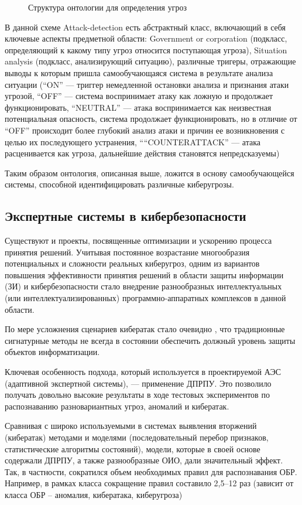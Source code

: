 \begin{figure}[h]
    \caption{Структура онтологии для определения угроз \cite{wars}}
    \label{ont}
\end{figure}

В данной схеме Attack-detection есть абстрактный класс, включающий в себя ключевые аспекты предметной
области: Government or corporation (подкласс, определяющий к какому типу угроз относится поступающая угроза),
Situation analysis (подкласс, анализирующий ситуацию), различные тригеры, отражающие выводы к которым пришла
самообучающаяся система в результате анализа ситуации (``ON'' --- триггер немедленной остановки анализа и
признания атаки угрозой, ``OFF'' --- система воспринимает атаку как ложную и продолжает функционировать,
``NEUTRAL'' --- атака воспринимается как неизвестная потенциальная опасность, система продолжает функционировать,
но в отличие от ``OFF'' происходит более глубокий анализ атаки и причин ее возникновения с целью их
последующего устранения, ``“COUNTERATTACK'' --- атака расценивается как угроза, дальнейшие действия становятся
непредсказуемы)

Таким образом онтология, описанная выше, ложится в основу самообучающейся системы, способной идентифицировать
различные киберугрозы.

\subsection{Экспертные системы в кибербезопасности}
Существуют и проекты, посвященные оптимизации и ускорению процесса принятия решений. Учитывая постоянное
возрастание многообразия потенциальных и сложности реальных киберугроз, одним из вариантов
повышения эффективности принятия решений в области защиты
информации (ЗИ) и кибербезопасности стало внедрение разнообразных интеллектуальных
(или интеллектуализированных) программно-аппаратных комплексов в
данной области.

По мере усложнения сценариев кибератак стало очевидно \cite{opt}, что традиционные
сигнатурные методы не всегда в состоянии обеспечить должный уровень защиты
объектов информатизации.

Ключевая особенность подхода, который используется в проектируемой
АЭС (адаптивной экспертной системы), –-- применение ДПРПУ. Это позволило получать довольно высокие результаты в ходе тестовых экспериментов по распознаванию разновариантных угроз,
аномалий и кибератак.

Сравнивая с широко используемыми в системах выявления вторжений (кибератак) методами и моделями
(последовательный перебор признаков, статистические алгоритмы состояний),
модели, которые в своей основе содержали ДПРПУ, а
также разнообразные ОИО, дали значительный эффект. Так, в частности, сократился
объем необходимых правил для распознавания ОБР. Например, в рамках
класса сокращение правил составило 2,5–12 раз (зависит от класса ОБР – аномалия,
кибератака, киберугроза)

